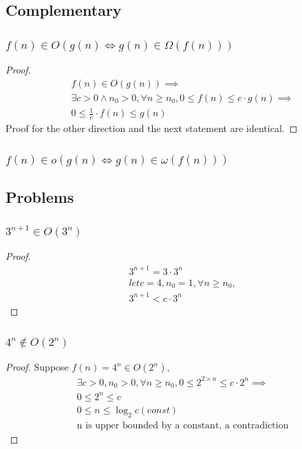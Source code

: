 \documentclass[9pt]{extarticle}
\begin{document}
\subsection{Complementary}
\subsubsection{$f(n) \in O(g(n) \iff g(n) \in \Omega(f(n)))$}
\begin{proof}
    \begin{align*}
        & f(n) \in O(g(n)) \implies \\
        & \exists c > 0 \land n_0 > 0, \forall n \geq n_0, 0 \leq f(n) \leq c \cdot g(n) \implies \\
        & 0 \leq \frac{1}{c}\cdot f(n) \leq g(n)
    \end{align*}
Proof for the other direction and the next statement are identical.
\end{proof}
\subsubsection{$f(n) \in o(g(n) \iff g(n) \in \omega(f(n)))$}

\subsection{Problems}
\subsubsection*{$3^{n + 1} \in O(3^n)$}
\begin{proof}
    \begin{align*}
        & 3^{n+ 1} = 3 \cdot 3^n\\
        & let c = 4, n_0 = 1, \forall n \geq n_0, \\
        & 3^{n+1} < c\cdot 3^n
    \end{align*}
\end{proof}
\subsubsection*{$4^n \notin O(2^n)$}
\begin{proof}
    Suppose $f(n) = 4^n \in O(2^n)$,\\
    \begin{align*}
        & \exists c > 0, n_0 > 0, \forall n \geq n_0, 0 \leq 2^{2 \times n} \leq c\cdot 2^n \implies\\
        & 0 \leq 2^n \leq c\\
        & 0 \leq n \leq \log_2c (const)\\
        & \text{n is upper bounded by a constant, a contradiction}
    \end{align*}
\end{proof}
\end{document}
